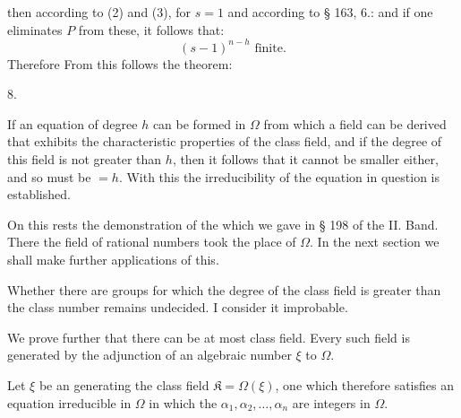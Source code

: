 
then according to (2) and (3), for $s=1$
and according to § 163, 6.:
and if one eliminates $P$ from these, it follows that:
\[
(s-1)^{n-h} \text{ finite.}
\]
Therefore
From this follows the theorem:

8. 

If an equation of degree $h$ can be formed in $\Omega$ from which a field can be derived that exhibits the characteristic properties of the class field, and if the degree of this field is not greater than $h$, then it follows that it cannot be smaller either, and so must be $= h$. With this the irreducibility of the equation in question is established.

On this rests the demonstration of the  which we gave in § 198 of the II. Band. There the field of rational numbers took the place of $\Omega$. In the next section we shall make further applications of this.

Whether there are groups for which the degree of the class field is greater than the class number remains undecided. I consider it improbable.

We prove further that there can be at most  class field. Every such field is generated by the adjunction of an algebraic number $\xi$ to $\Omega$.

Let $\xi$ be an  generating the class field $\mathfrak{K} = \Omega(\xi)$, one which therefore satisfies an equation irreducible in $\Omega$
in which the $\alpha_1, \alpha_2, \ldots, \alpha_n$ are integers in $\Omega$.
